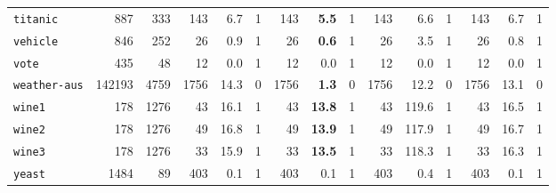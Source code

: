 \begin{tabular}{lccrrrrrrrrrrrr}
\texttt{titanic} & \multicolumn{1}{r}{887} & \multicolumn{1}{r}{333}  & 143 & 6.7 & 1 & 143 & \textbf{5.5} & 1 & 143 & 6.6 & 1 & 143 & 6.7 & 1\\
\texttt{vehicle} & \multicolumn{1}{r}{846} & \multicolumn{1}{r}{252}  & 26 & 0.9 & 1 & 26 & \textbf{0.6} & 1 & 26 & 3.5 & 1 & 26 & 0.8 & 1\\
\texttt{vote} & \multicolumn{1}{r}{435} & \multicolumn{1}{r}{48}  & 12 & 0.0 & 1 & 12 & 0.0 & 1 & 12 & 0.0 & 1 & 12 & 0.0 & 1\\
\texttt{weather-aus} & \multicolumn{1}{r}{142193} & \multicolumn{1}{r}{4759}  & 1756 & 14.3 & 0 & 1756 & \textbf{1.3} & 0 & 1756 & 12.2 & 0 & 1756 & 13.1 & 0\\
\texttt{wine1} & \multicolumn{1}{r}{178} & \multicolumn{1}{r}{1276}  & 43 & 16.1 & 1 & 43 & \textbf{13.8} & 1 & 43 & 119.6 & 1 & 43 & 16.5 & 1\\
\texttt{wine2} & \multicolumn{1}{r}{178} & \multicolumn{1}{r}{1276}  & 49 & 16.8 & 1 & 49 & \textbf{13.9} & 1 & 49 & 117.9 & 1 & 49 & 16.7 & 1\\
\texttt{wine3} & \multicolumn{1}{r}{178} & \multicolumn{1}{r}{1276}  & 33 & 15.9 & 1 & 33 & \textbf{13.5} & 1 & 33 & 118.3 & 1 & 33 & 16.3 & 1\\
\texttt{yeast} & \multicolumn{1}{r}{1484} & \multicolumn{1}{r}{89}  & 403 & 0.1 & 1 & 403 & 0.1 & 1 & 403 & 0.4 & 1 & 403 & 0.1 & 1\\
\bottomrule
\end{tabular}
